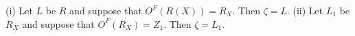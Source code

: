 (i) Let $L$ be $R$ and suppose that $O^F(R(X)) = R_X$. Then $\zeta = L$.
(ii) Let $L_1$ be $R_X$ and suppose that $O^F(R_X) = Z_1$. Then $\zeta = L_1$.
